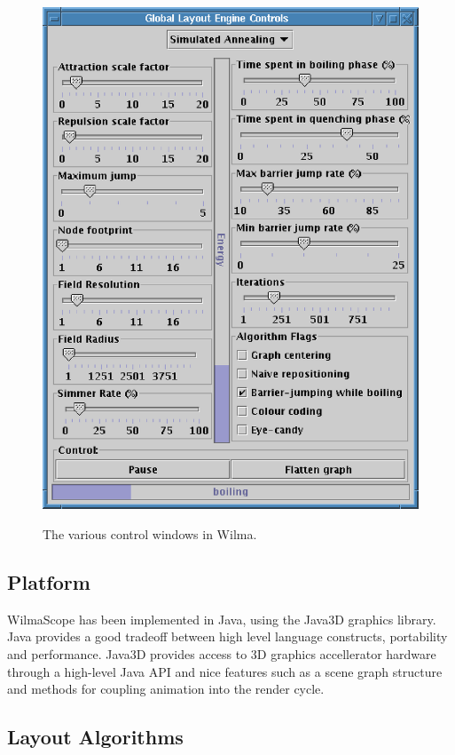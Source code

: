 \documentclass[runningheads]{cl2emult}
\begin{document}
\begin{figure}
{{    \includegraphics{figures/wilma-simannealcontrols.eps}}}
  \caption{The various control windows in Wilma.}
\end{figure}

\subsection{Platform}

WilmaScope has been implemented in Java, using the Java3D graphics library.
Java provides a good tradeoff between high level language constructs,
portability and performance.  Java3D provides access to 3D graphics accellerator hardware through
a high-level Java API and nice features such as a scene graph
structure and methods for coupling animation into the render cycle.

\subsection{Layout Algorithms}
\end{document}
